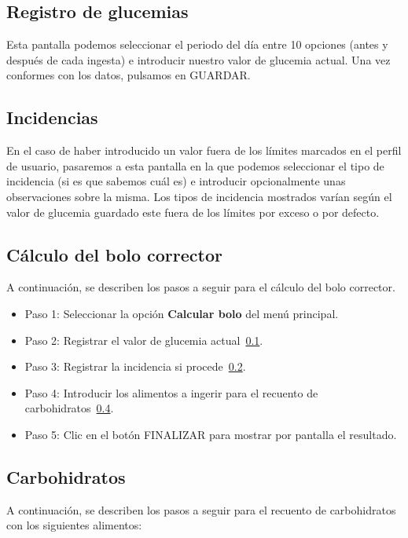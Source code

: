 \subsection{Registro de glucemias}\label{ssec:registroglu}
Esta pantalla podemos seleccionar el periodo del día entre 10 opciones (antes y después de cada ingesta) e introducir nuestro valor de glucemia actual. Una vez conformes con los datos, pulsamos en GUARDAR.
\subsection{Incidencias}\label{ssec:incidencias}
En el caso de haber introducido un valor fuera de los límites marcados en el perfil de usuario, pasaremos a esta pantalla en la que podemos seleccionar el tipo de incidencia (si es que sabemos cuál es) e introducir opcionalmente unas observaciones sobre la misma. Los tipos de incidencia mostrados varían según el valor de glucemia guardado este fuera de los límites por exceso o por defecto.

\subsection{Cálculo del bolo corrector}\label{ssec:calculabolo}
A continuación, se describen los pasos a seguir para el cálculo del bolo corrector.
\begin{itemize}
	\item Paso 1: Seleccionar la opción \textbf{Calcular bolo} del menú principal.
	\item Paso 2: Registrar el valor de glucemia actual~\ref{ssec:registroglu}.
	\item Paso 3: Registrar la incidencia si procede~\ref{ssec:incidencias}.
	\item Paso 4: Introducir los alimentos a ingerir para el recuento de carbohidratos~\ref{ssec:carbos}.
	\item Paso 5: Clic en el botón FINALIZAR para mostrar por pantalla el resultado.
\end{itemize}
\subsection{Carbohidratos}\label{ssec:carbos}
A continuación, se describen los pasos a seguir para el recuento de carbohidratos con los siguientes alimentos:

